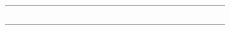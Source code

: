 \documentclass[12pt,a4paper]{article}
\begin{document}
\begin{landscape}
\begin{table}[ht!]
\begin{tabular}{|l|l|l|l|l|l|l|l|l|l|l|l|l|l|l|l|l|l|l|l|l|l|l|l|l|l|}
			                               &                                          &    &    &    &    &    &    &    &    &     &     &     &     &     &     &     &     &     &     &     &           \\\hline
			                               &                                          &    &    &    &    &    &    &    &    &     &     &     &     &     &     &     &     &     &     &     &           \\\hline
			                               &                                          &    &    &    &    &    &    &    &    &     &     &     &     &     &     &     &     &     &     &     &           \\\hline
			                               &                                          &    &    &    &    &    &    &    &    &     &     &     &     &     &     &     &     &     &     &     &           \\\hline
			                               &                                          &    &    &    &    &    &    &    &    &     &     &     &     &     &     &     &     &     &     &     &           \\\hline
			                               &                                          &    &    &    &    &    &    &    &    &     &     &     &     &     &     &     &     &     &     &     &           \\\hline
			                               &                                          &    &    &    &    &    &    &    &    &     &     &     &     &     &     &     &     &     &     &     &           \\\hline
		\end{tabular}
	\end{table}
\end{landscape}
\end{document}
